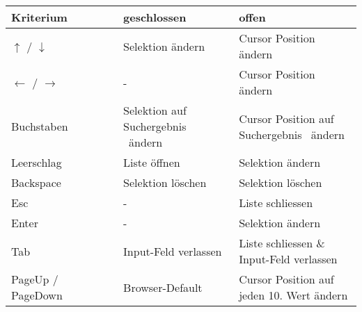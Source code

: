 \begin{table}[!htb] %
    \label{table:interactionNewComponent}
    \footnotesize
    \begin{adjustbox}{max width=\textwidth}
        \begin{threeparttable}
            \begin{tabular}{ l || l | l }
                \bf{Kriterium}    & \bf{geschlossen} & \bf{offen} \\
                \hline \hline
                $\uparrow$ / $\downarrow$    & Selektion ändern     & Cursor Position ändern                \\
                \hline
                $\leftarrow$ / $\rightarrow$ & -                    & Cursor Position ändern                \\
                \hline
                Buchstaben  & \tbbr{Selektion auf \\ 
                                    Suchergebnis\tnote{1} \ ändern} & \tbbr{Cursor Position auf \\ 
                                                                            Suchergebnis\tnote{1} \ ändern} \\
                \hline
                Leerschlag  & Liste öffnen                     & Selektion ändern  \\
                \hline
                Backspace   & Selektion löschen                & Selektion löschen \\
                \hline
                Esc         & -                                & Liste schliessen  \\
                \hline \hline
                Enter       & -                                & Selektion ändern  \\
                \hline
                Tab         & Input-Feld verlassen             & \tbbr{Liste schliessen \& \\ 
                                                                       Input-Feld verlassen}                  \\
                \hline
                PageUp / PageDown & Browser-Default\tnote{2}   & \tbbr{Cursor Position auf \\ 
                                                                       jeden 10. Wert ändern}                 \\

\end{tabular}
\end{threeparttable}
\end{adjustbox}
\end{table}
